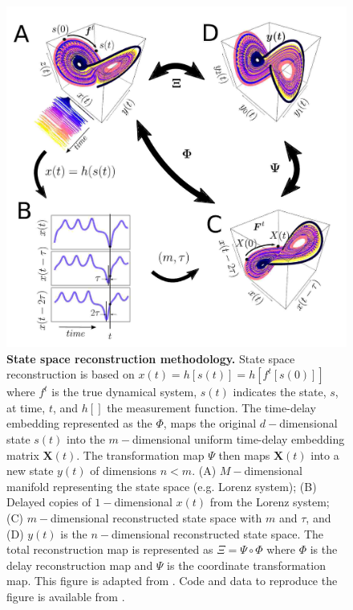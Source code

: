 \documentclass[fleqn,10pt]{wlscirep}
\begin{document}
\begin{figure}[ht]
\centering
\includegraphics[width=1.0\textwidth]{figures/methods/rss/pdf/rss}
    \caption{
	{\bf State space reconstruction methodology.}
	State space reconstruction is based on $x(t)=h[s(t)]= h[f^t [s(0)]]$
	where $f^t$ is the true dynamical system, $s(t)$ indicates the state,
    	$s$, at time, $t$,  and $h[ ]$ the measurement function. 
    	The time-delay embedding represented as the $\Phi$, maps the original
    	$d-$dimensional state $s(t)$ into the $m-$dimensional uniform 
	time-delay embedding matrix $\boldsymbol{X}(t)$.
    	The transformation map $\Psi$ then maps $\boldsymbol{X}(t)$ into 
	a new state $y(t)$ of dimensions $n < m$.
    	(A) $M-$dimensional manifold representing the state space 
	(e.g. Lorenz system);
    	(B) Delayed copies of $1-$dimensional $x(t)$ from the Lorenz system;
   	(C) $m-$dimensional reconstructed state space with 
    	\texorpdfstring{$m$}{m} and    \texorpdfstring{$\tau$}{T}, and 
    	(D) $y(t)$ is the $n-$dimensional reconstructed state space.
	The total reconstruction map is represented as $\Xi = \Psi \circ \Phi $
	where $\Phi$ is the delay reconstruction map and 
	$\Psi$ is the coordinate transformation map.
	This figure is adapted from 
   	\cite{Quintana-Duque2012, casdagli1991, uzal2011}.
	Code and data to reproduce the figure is available from \cite{srep2019}.
    }
    \label{fig:ssr}
\end{figure}
\end{document}
